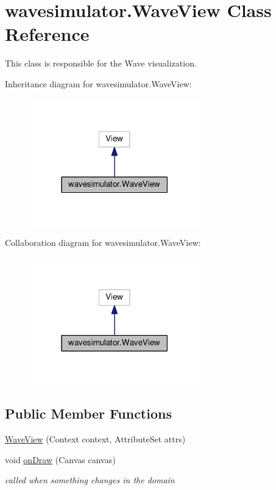 \hypertarget{classwavesimulator_1_1WaveView}{}\section{wavesimulator.\+Wave\+View Class Reference}
\label{classwavesimulator_1_1WaveView}


This class is responsible for the Wave visualization.  




Inheritance diagram for wavesimulator.\+Wave\+View\+:\nopagebreak
\begin{figure}[H]
\begin{center}
\leavevmode
\includegraphics[width=210pt]{classwavesimulator_1_1WaveView__inherit__graph}
\end{center}
\end{figure}


Collaboration diagram for wavesimulator.\+Wave\+View\+:\nopagebreak
\begin{figure}[H]
\begin{center}
\leavevmode
\includegraphics[width=210pt]{classwavesimulator_1_1WaveView__coll__graph}
\end{center}
\end{figure}
\subsection*{Public Member Functions}
\begin{DoxyCompactItemize}
\item 
\hyperlink{classwavesimulator_1_1WaveView_a9ec88e17333db01de8637efedf66fa1b}{Wave\+View} (Context context, Attribute\+Set attrs)
\item 
void \hyperlink{classwavesimulator_1_1WaveView_a2c9aa15893e998681246c9c9ae0de77f}{on\+Draw} (Canvas canvas)
\begin{DoxyCompactList}\small\item\em called when something changes in the domain \end{DoxyCompactList}\end{DoxyCompactItemize}
